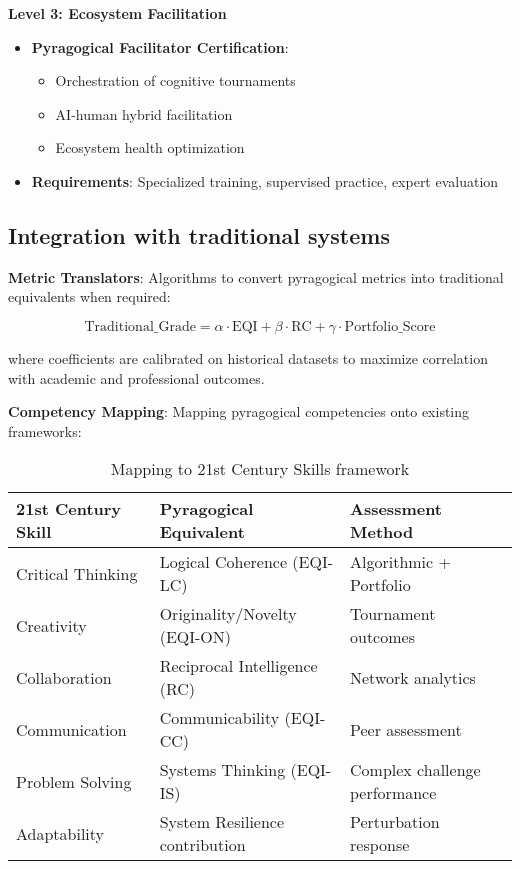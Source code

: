 \textbf{Level 3: Ecosystem Facilitation}
\begin{itemize}
	\item \textbf{Pyragogical Facilitator Certification}:
	\begin{itemize}
		\item Orchestration of cognitive tournaments
		\item AI-human hybrid facilitation
		\item Ecosystem health optimization
	\end{itemize}
	\item \textbf{Requirements}: Specialized training, supervised practice, expert evaluation
\end{itemize}

\subsection{Integration with traditional systems}

\textbf{Metric Translators}:
Algorithms to convert pyragogical metrics into traditional equivalents when required:

\begin{equation}
	\text{Traditional\_Grade} = \alpha \cdot \text{EQI} + \beta \cdot \text{RC} + \gamma \cdot \text{Portfolio\_Score}
	\label{eq:grade-translation}
\end{equation}

where coefficients are calibrated on historical datasets to maximize correlation with academic and professional outcomes.

\textbf{Competency Mapping}:
Mapping pyragogical competencies onto existing frameworks:

\begin{table}[h]
	\centering
	\caption{Mapping to 21st Century Skills framework}
	\label{tab:competency-mapping}
	\begin{tabular}{p{4cm}p{4cm}p{4cm}}
		\toprule
		\textbf{21st Century Skill} & \textbf{Pyragogical Equivalent} & \textbf{Assessment Method} \\
		\midrule
		Critical Thinking & Logical Coherence (EQI-LC) & Algorithmic + Portfolio \\
		\hline
		Creativity & Originality/Novelty (EQI-ON) & Tournament outcomes \\
		\hline
		Collaboration & Reciprocal Intelligence (RC) & Network analytics \\
		\hline
		Communication & Communicability (EQI-CC) & Peer assessment \\
		\hline
		Problem Solving & Systems Thinking (EQI-IS) & Complex challenge performance \\
		\hline
		Adaptability & System Resilience contribution & Perturbation response \\
		\bottomrule
	\end{tabular}
\end{table}

